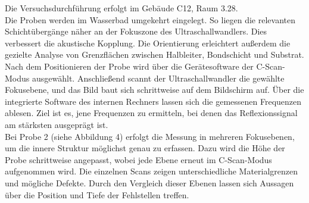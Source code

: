 
Die Versuchsdurchführung erfolgt im Gebäude C12, Raum 3.28. \\
Die Proben werden im Wasserbad umgekehrt eingelegt. So liegen die relevanten Schichtübergänge näher an der Fokuszone des Ultraschallwandlers. Dies verbessert die akustische Kopplung. Die Orientierung erleichtert außerdem die gezielte Analyse von Grenzflächen zwischen Halbleiter, Bondschicht und Substrat. \\
Nach dem Positionieren der Probe wird über die Gerätesoftware der C-Scan-Modus ausgewählt. Anschließend scannt der Ultraschallwandler die gewählte Fokusebene, und das Bild baut sich schrittweise auf dem Bildschirm auf. Über die integrierte Software des internen Rechners lassen sich die gemessenen Frequenzen ablesen. Ziel ist es, jene Frequenzen zu ermitteln, bei denen das Reflexionssignal am stärksten ausgeprägt ist.\\
Bei Probe 2 (siehe Abbildung 4) erfolgt die Messung in mehreren Fokusebenen, um die innere Struktur möglichst genau zu erfassen. Dazu wird die Höhe der Probe schrittweise angepasst, wobei jede Ebene erneut im C-Scan-Modus aufgenommen wird. Die einzelnen Scans zeigen unterschiedliche Materialgrenzen und mögliche Defekte. Durch den Vergleich dieser Ebenen lassen sich Aussagen über die Position und Tiefe der Fehlstellen treffen.